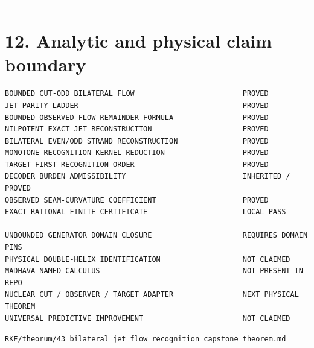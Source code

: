 \begin{center}\rule{0.5\linewidth}{0.5pt}\end{center}

\hypertarget{analytic-and-physical-claim-boundary}{%
\section{12. Analytic and physical claim boundary}\label{analytic-and-physical-claim-boundary}}

\begin{verbatim}
BOUNDED CUT-ODD BILATERAL FLOW                         PROVED
JET PARITY LADDER                                      PROVED
BOUNDED OBSERVED-FLOW REMAINDER FORMULA                PROVED
NILPOTENT EXACT JET RECONSTRUCTION                     PROVED
BILATERAL EVEN/ODD STRAND RECONSTRUCTION               PROVED
MONOTONE RECOGNITION-KERNEL REDUCTION                  PROVED
TARGET FIRST-RECOGNITION ORDER                         PROVED
DECODER BURDEN ADMISSIBILITY                           INHERITED / PROVED
OBSERVED SEAM-CURVATURE COEFFICIENT                    PROVED
EXACT RATIONAL FINITE CERTIFICATE                      LOCAL PASS

UNBOUNDED GENERATOR DOMAIN CLOSURE                     REQUIRES DOMAIN PINS
PHYSICAL DOUBLE-HELIX IDENTIFICATION                   NOT CLAIMED
MADHAVA-NAMED CALCULUS                                 NOT PRESENT IN REPO
NUCLEAR CUT / OBSERVER / TARGET ADAPTER                NEXT PHYSICAL THEOREM
UNIVERSAL PREDICTIVE IMPROVEMENT                       NOT CLAIMED
\end{verbatim}

\begin{flushright}\small\texttt{RKF/theorum/43\_bilateral\_jet\_flow\_recognition\_capstone\_theorem.md}\end{flushright}
